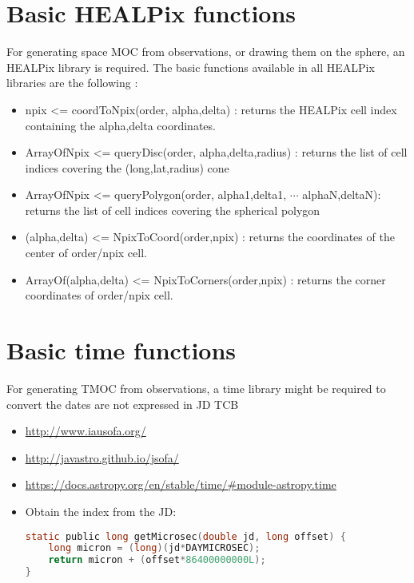 \section{Basic HEALPix functions}
For generating space MOC from observations, or drawing them on the
sphere, an HEALPix library is required. The basic functions available
in all HEALPix libraries are the following :
\begin{itemize}
   \item npix <= coordToNpix(order, alpha,delta) : returns the HEALPix
     cell index containing the alpha,delta coordinates.
   \item ArrayOfNpix <= queryDisc(order, alpha,delta,radius) : returns
     the list of cell indices covering the (long,lat,radius) cone
   \item ArrayOfNpix <= queryPolygon(order, alpha1,delta1, $\cdots$
     alphaN,deltaN): returns the list of cell indices covering the
     spherical polygon
   \item (alpha,delta) <= NpixToCoord(order,npix) : returns the
     coordinates of the center of order/npix cell.
   \item ArrayOf(alpha,delta) <= NpixToCorners(order,npix) : returns
     the corner coordinates of order/npix cell.
\end{itemize}

\section{Basic time functions} 
For generating TMOC from observations, a time library might be required to convert the dates are not expressed in JD TCB
\begin{itemize} 
\item \url{http://www.iausofa.org/}
\item \url{http://javastro.github.io/jsofa/}
\item \url{https://docs.astropy.org/en/stable/time/#module-astropy.time}
\item Obtain the index from the JD: 
\begin{lstlisting}[language=C]
static public long getMicrosec(double jd, long offset) {
    long micron = (long)(jd*DAYMICROSEC);
    return micron + (offset*86400000000L);
}
\end{lstlisting}
\end{itemize} 

